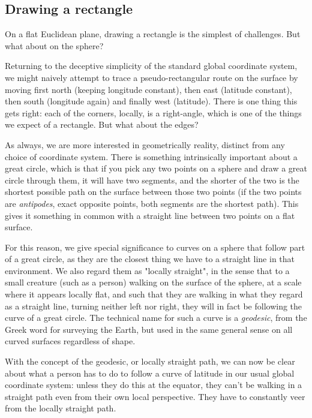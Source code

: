 \subsection{Drawing a rectangle}

On a flat Euclidean plane, drawing a rectangle is the simplest of challenges. But what about on the sphere?

Returning to the deceptive simplicity of the standard global coordinate system, we might naively attempt to trace a pseudo-rectangular route on the surface by moving first north (keeping longitude constant), then east (latitude constant), then south (longitude again) and finally west (latitude). There is one thing this gets right: each of the corners, locally, is a right-angle, which is one of the things we expect of a rectangle. But what about the edges?

As always, we are more interested in geometrically reality, distinct from any choice of coordinate system. There is something intrinsically important about a great circle, which is that if you pick any two points on a sphere and draw a great circle through them, it will have two segments, and the shorter of the two is the shortest possible path on the surface between those two points (if the two points are \textit{antipodes}, exact opposite points, both segments are the shortest path). This gives it something in common with a straight line between two points on a flat surface.

For this reason, we give special significance to curves on a sphere that follow part of a great circle, as they are the closest thing we have to a straight line in that environment. We also regard them as "locally straight", in the sense that to a small creature (such as a person) walking on the surface of the sphere, at a scale where it appears locally flat, and such that they are walking in what they regard as a straight line, turning neither left nor right, they will in fact be following the curve of a great circle. The technical name for such a curve is a \textit{geodesic}, from the Greek word for surveying the Earth, but used in the same general sense on all curved surfaces regardless of shape.

With the concept of the geodesic, or locally straight path, we can now be clear about what a person has to do to follow a curve of latitude in our usual global coordinate system: unless they do this at the equator, they can't be walking in a straight path even from their own local perspective. They have to constantly veer from the locally straight path.

